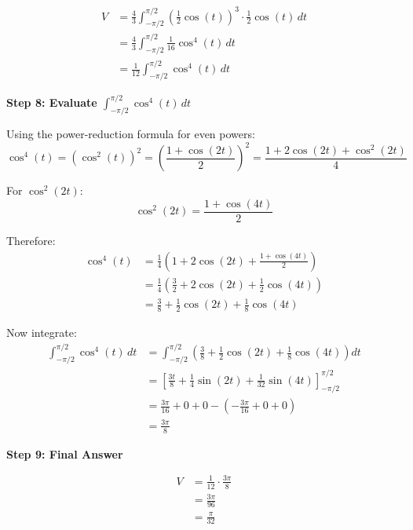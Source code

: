 \begin{align*}
V &= \frac{4}{3}\int_{-\pi/2}^{\pi/2} \left(\frac{1}{2}\cos(t)\right)^3 \cdot \frac{1}{2}\cos(t) \, dt \\
&= \frac{4}{3}\int_{-\pi/2}^{\pi/2} \frac{1}{16}\cos^4(t) \, dt \\
&= \frac{1}{12}\int_{-\pi/2}^{\pi/2} \cos^4(t) \, dt
\end{align*}
 
\textbf{Step 8: Evaluate $\int_{-\pi/2}^{\pi/2} \cos^4(t) \, dt$}
 
Using the power-reduction formula for even powers:
\[
\cos^4(t) = \left(\cos^2(t)\right)^2 = \left(\frac{1 + \cos(2t)}{2}\right)^2 = \frac{1 + 2\cos(2t) + \cos^2(2t)}{4}
\]
 
For $\cos^2(2t)$:
\[
\cos^2(2t) = \frac{1 + \cos(4t)}{2}
\]
 
Therefore:
\begin{align*}
\cos^4(t) &= \frac{1}{4}\left(1 + 2\cos(2t) + \frac{1 + \cos(4t)}{2}\right) \\
&= \frac{1}{4}\left(\frac{3}{2} + 2\cos(2t) + \frac{1}{2}\cos(4t)\right) \\
&= \frac{3}{8} + \frac{1}{2}\cos(2t) + \frac{1}{8}\cos(4t)
\end{align*}
 
Now integrate:
\begin{align*}
\int_{-\pi/2}^{\pi/2} \cos^4(t) \, dt &= \int_{-\pi/2}^{\pi/2} \left(\frac{3}{8} + \frac{1}{2}\cos(2t) + \frac{1}{8}\cos(4t)\right) dt \\
&= \left[\frac{3t}{8} + \frac{1}{4}\sin(2t) + \frac{1}{32}\sin(4t)\right]_{-\pi/2}^{\pi/2} \\
&= \frac{3\pi}{16} + 0 + 0 - \left(-\frac{3\pi}{16} + 0 + 0\right) \\
&= \frac{3\pi}{8}
\end{align*}
 
\textbf{Step 9: Final Answer}
 
\begin{align*}
V &= \frac{1}{12} \cdot \frac{3\pi}{8} \\
&= \frac{3\pi}{96} \\
&= \frac{\pi}{32}
\end{align*}
 
